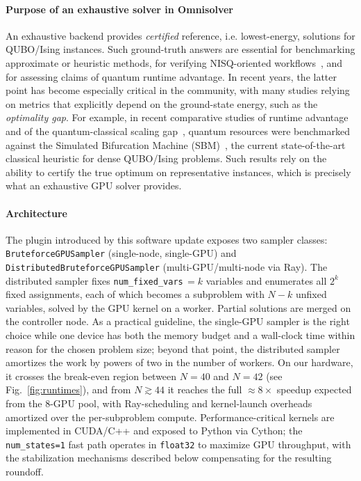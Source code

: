 \documentclass[preprint,12pt,a4paper]{elsarticle}
\begin{document}
\paragraph{Purpose of an exhaustive solver in Omnisolver}
An exhaustive backend provides \emph{certified} reference, i.e. lowest-energy,
solutions for QUBO/Ising instances. Such ground-truth answers are essential for
benchmarking approximate or heuristic methods, for verifying NISQ-oriented
workflows~\cite{preskill2018quantum}, and for assessing claims of quantum
runtime advantage. In recent years, the latter point has become especially
critical in the community, with many studies relying on metrics that
explicitly depend on the ground-state energy, such as the \emph{optimality gap}.
For example, in recent comparative studies of runtime
advantage~\cite{tuziemski2026limits} and of the quantum-classical scaling
gap~\cite{pawlowski2025closing}, quantum resources were benchmarked against the
Simulated Bifurcation Machine
(SBM)~\cite{goto2016bifurcation,goto2019combinatorial,goto2021high,pawlowski2026sbqa},
the current state-of-the-art classical heuristic for dense QUBO/Ising problems.
Such results rely on the ability to certify the true optimum on representative
instances, which is precisely what an exhaustive GPU solver provides.

\paragraph{Architecture}
The plugin introduced by this software update exposes two sampler classes:
\texttt{BruteforceGPUSampler} (single-node, single-GPU) and
\texttt{DistributedBruteforceGPUSampler} (multi-GPU/multi-node via Ray). The
distributed sampler fixes \texttt{num\_fixed\_vars}\,$=k$ variables and
enumerates all $2^{k}$ fixed assignments, each of which becomes a subproblem
with $N-k$ unfixed variables, solved by the GPU kernel on a worker. Partial
solutions are merged on the controller node. As a practical guideline, the
single-GPU sampler is the right choice while one device has both the memory
budget and a wall-clock time within reason for the chosen problem size;
beyond that point, the distributed sampler amortizes the work by powers of
two in the number of workers. On our hardware, it crosses the break-even
region between $N=40$ and $N=42$ (see Fig.~\ref{fig:runtimes}), and from
$N\!\gtrsim\!44$ it reaches the full $\approx\!8\times$ speedup expected
from the 8-GPU pool, with Ray-scheduling and kernel-launch overheads
amortized over the per-subproblem compute. Performance-critical
kernels are implemented in CUDA/C++ and exposed to Python via Cython; the
\texttt{num\_states=1} fast path operates in \texttt{float32} to maximize GPU
throughput, with the stabilization mechanisms described below compensating
for the resulting roundoff.
\end{document}
